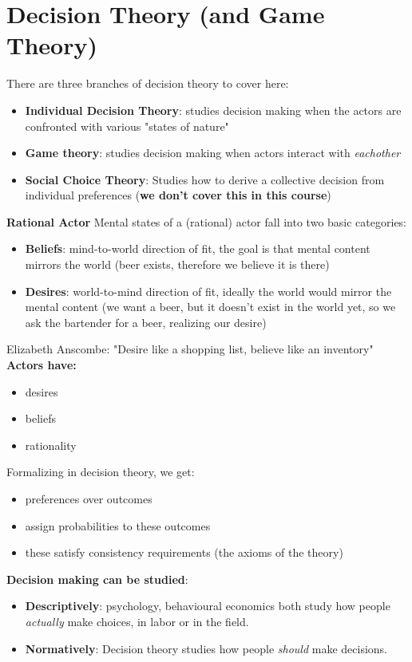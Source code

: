\documentclass{article}
\begin{document}
\section{Decision Theory (and Game Theory)}
    There are three branches of decision theory to cover here:
    \begin{itemize}
        \item \textbf{Individual Decision Theory}: studies decision making when the actors are confronted with various "states of nature"
        \item \textbf{Game theory}: studies decision making when actors interact with \textit{eachother}
        \item \textbf{Social Choice Theory}: Studies how to derive a collective decision from individual preferences (\textbf{we don't cover this in this course})
    \end{itemize}
    \textbf{Rational Actor}
    Mental states of a (rational) actor fall into two basic categories:
    \begin{itemize}
        \item \textbf{Beliefs}: mind-to-world direction of fit, the goal is that mental content mirrors the world (beer exists, therefore we believe it is there)
        \item \textbf{Desires}: world-to-mind direction of fit, ideally the world would mirror the mental content (we want a beer, but it doesn't exist in the world yet, so we ask the bartender for a beer, realizing our desire)
    \end{itemize}
    Elizabeth Anscombe: "Desire like a shopping list, believe like an inventory"
    \bigbreak \textbf{Actors have:}
    \begin{itemize}
        \item desires
        \item beliefs
        \item rationality
    \end{itemize}{}
    Formalizing in decision theory, we get:
    \begin{itemize}
        \item preferences over outcomes
        \item assign probabilities to these outcomes
        \item these satisfy consistency requirements (the axioms of the theory)
    \end{itemize}
    \bigbreak \textbf{Decision making can be studied}:
    \begin{itemize}
        \item \textbf{Descriptively}: psychology, behavioural economics both study how people \textit{actually} make choices, in labor or in the field.
        \item \textbf{Normatively}: Decision theory studies how people \textit{should} make decisions.
    \end{itemize}
\end{document}
